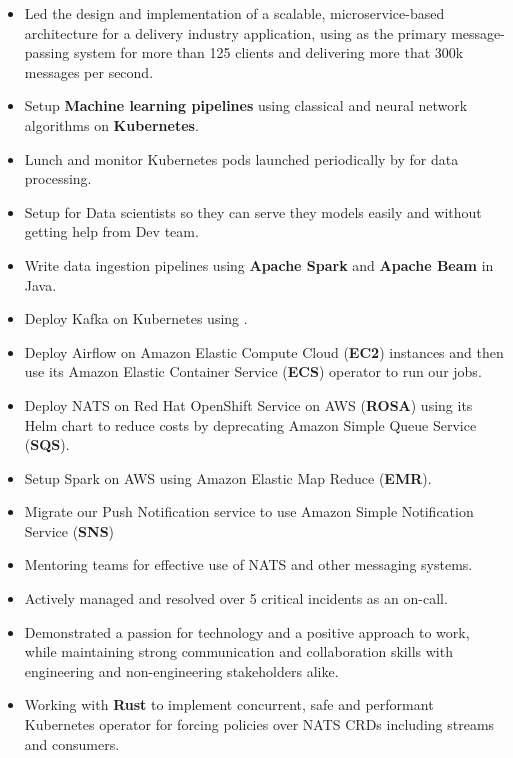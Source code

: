\begin{itemize}
      \item Led the design and implementation of a scalable, microservice-based architecture for a delivery industry application,
            using  as the primary message-passing system for more than 125 clients and delivering
            more that 300k messages per second.
      \item Setup \textbf{Machine learning pipelines} using classical and neural network algorithms on \textbf{Kubernetes}.
      \item Lunch and monitor Kubernetes pods launched periodically by  for data processing.
      \item Setup  for Data scientists so they can serve they models easily and without getting help from Dev team.
      \item Write data ingestion pipelines using \textbf{Apache Spark} and \textbf{Apache Beam} in Java.
      \item Deploy Kafka on Kubernetes using .
      \item Deploy Airflow on Amazon Elastic Compute Cloud (\textbf{EC2}) instances and then use its Amazon Elastic Container Service (\textbf{ECS}) operator to run our jobs.
      \item Deploy NATS on Red Hat OpenShift Service on AWS (\textbf{ROSA})
            using its Helm chart to reduce costs by deprecating Amazon Simple Queue Service (\textbf{SQS}).
      \item Setup Spark on AWS using Amazon Elastic Map Reduce (\textbf{EMR}).
      \item Migrate our Push Notification service to use Amazon Simple Notification Service (\textbf{SNS})
      \item Mentoring teams for effective use of NATS and other messaging systems.
      \item Actively managed and resolved over 5 critical incidents as an on-call.
      \item Demonstrated a passion for technology and a positive approach to work,
            while maintaining strong communication and collaboration skills with engineering
            and non-engineering stakeholders alike.
      \item Working with \textbf{Rust} to implement concurrent, safe and performant Kubernetes operator for forcing
            policies over NATS CRDs including streams and consumers.
\end{itemize}

